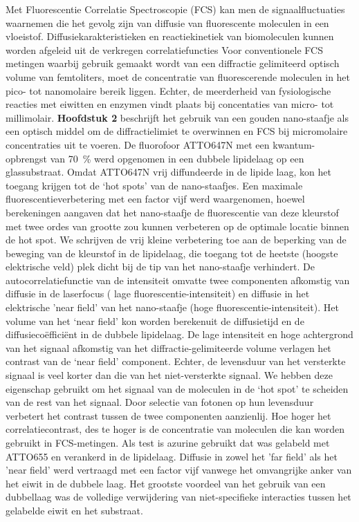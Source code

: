 Met Fluorescentie Correlatie Spectroscopie (FCS) kan men de signaalfluctuaties waarnemen die het gevolg zijn van diffusie van fluorescente moleculen in een vloeistof. Diffusiekarakteristieken en reactiekinetiek van biomoleculen kunnen worden afgeleid uit de verkregen correlatiefuncties Voor conventionele FCS metingen waarbij gebruik gemaakt wordt van een diffractie gelimiteerd optisch volume van femtoliters, moet de concentratie
van fluorescerende moleculen in het pico- tot nanomolaire bereik liggen. Echter, de meerderheid van fysiologische reacties met eiwitten en enzymen vindt plaats bij concentaties van micro- tot millimolair.  \textbf{Hoofdstuk 2} beschrijft het gebruik van een gouden nano-staafje als een optisch middel  om de diffractielimiet te overwinnen en FCS bij micromolaire concentraties uit te voeren. De fluorofoor ATTO647N met een kwantum-opbrengst van \SI{70}{\percent} werd opgenomen in een dubbele lipidelaag op een glassubstraat. Omdat ATTO647N vrij diffundeerde in de lipide laag, kon het toegang krijgen tot de ‘hot spots’ van de nano-staafjes. Een maximale fluorescentieverbetering met een factor vijf werd waargenomen, hoewel berekeningen aangaven dat het nano-staafje de fluorescentie van deze kleurstof met twee ordes van grootte zou kunnen verbeteren op de optimale locatie binnen de hot spot. We schrijven de vrij kleine verbetering toe aan de beperking van de beweging van de kleurstof in de lipidelaag, die toegang tot de heetste (hoogste elektrische veld) plek dicht bij de tip van het nano-staafje verhindert. De autocorrelatiefunctie van de intensiteit omvatte twee componenten afkomstig van diffusie in de laserfocus ( lage fluorescentie-intensiteit) en diffusie in het elektrische ’near field’  van het nano-staafje (hoge fluorescentie-intensiteit). Het volume van het ‘near field’ kon worden berekenuit de diffusietijd en de diffusiecoëfficiënt in de dubbele lipidelaag. De lage intensiteit en hoge achtergrond van  het signaal afkomstig van het diffractie-gelimiteerde volume verlagen het contrast van de ‘near field’ component. Echter, de levensduur van het versterkte signaal is veel korter dan die van het niet-versterkte signaal. We hebben deze eigenschap gebruikt om het signaal van de moleculen in de ‘hot spot’ te scheiden van de rest van het signaal. Door selectie van fotonen op hun levensduur verbetert het contrast tussen de twee componenten aanzienlij. Hoe hoger het correlatiecontrast, des te hoger is de concentratie van moleculen die kan worden gebruikt in FCS-metingen. Als test is azurine gebruikt dat was gelabeld met ATTO655 en verankerd in de lipidelaag. Diffusie in zowel het ’far field’  als het ’near field’ werd vertraagd met een factor vijf vanwege het omvangrijke anker van het eiwit in de dubbele laag. Het grootste voordeel van het gebruik van een dubbellaag was de volledige verwijdering van niet-specifieke interacties tussen het gelabelde eiwit en het substraat.
 


